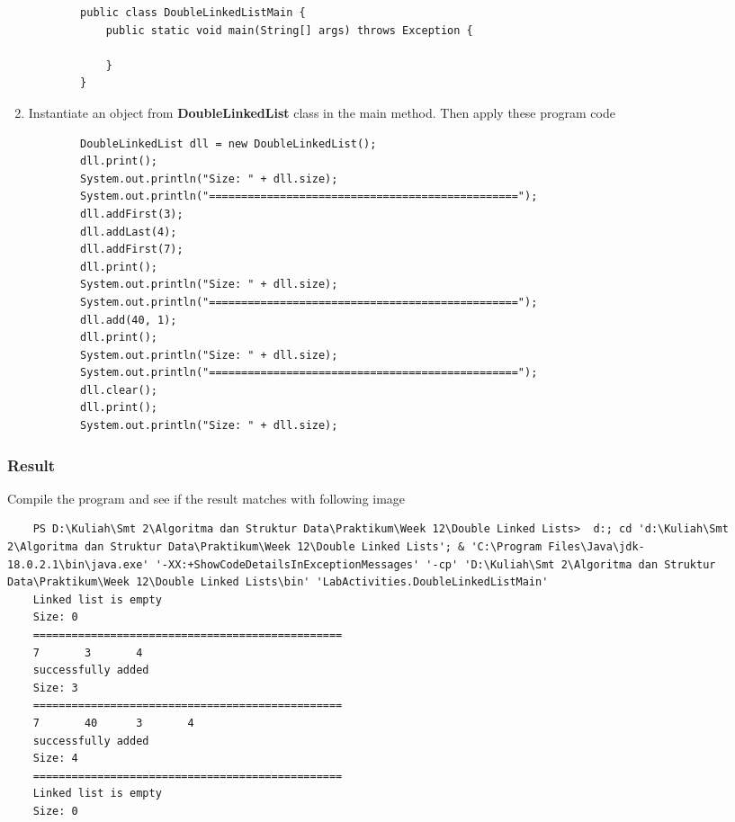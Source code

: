 \documentclass[12pt,titlepage]{article}
\begin{document}
\begin{enumerate}
\begin{verbatim}
        public class DoubleLinkedListMain {
            public static void main(String[] args) throws Exception {

            }
        }
    \end{verbatim}
    \item Instantiate an object from \textbf{DoubleLinkedList} class in the main method. Then apply these program code
    \begin{verbatim}
        DoubleLinkedList dll = new DoubleLinkedList();
        dll.print();
        System.out.println("Size: " + dll.size);
        System.out.println("================================================");
        dll.addFirst(3);
        dll.addLast(4);
        dll.addFirst(7);
        dll.print();
        System.out.println("Size: " + dll.size);
        System.out.println("================================================");
        dll.add(40, 1);
        dll.print();
        System.out.println("Size: " + dll.size);
        System.out.println("================================================");
        dll.clear();
        dll.print();
        System.out.println("Size: " + dll.size);
    \end{verbatim}
\end{enumerate}

\subsubsection{Result}
Compile the program and see if the result matches with following image
\begin{verbatim}
    PS D:\Kuliah\Smt 2\Algoritma dan Struktur Data\Praktikum\Week 12\Double Linked Lists>  d:; cd 'd:\Kuliah\Smt 2\Algoritma dan Struktur Data\Praktikum\Week 12\Double Linked Lists'; & 'C:\Program Files\Java\jdk-18.0.2.1\bin\java.exe' '-XX:+ShowCodeDetailsInExceptionMessages' '-cp' 'D:\Kuliah\Smt 2\Algoritma dan Struktur Data\Praktikum\Week 12\Double Linked Lists\bin' 'LabActivities.DoubleLinkedListMain'
    Linked list is empty
    Size: 0
    ================================================
    7       3       4
    successfully added
    Size: 3
    ================================================
    7       40      3       4
    successfully added
    Size: 4
    ================================================
    Linked list is empty
    Size: 0
\end{verbatim}
\end{document}
